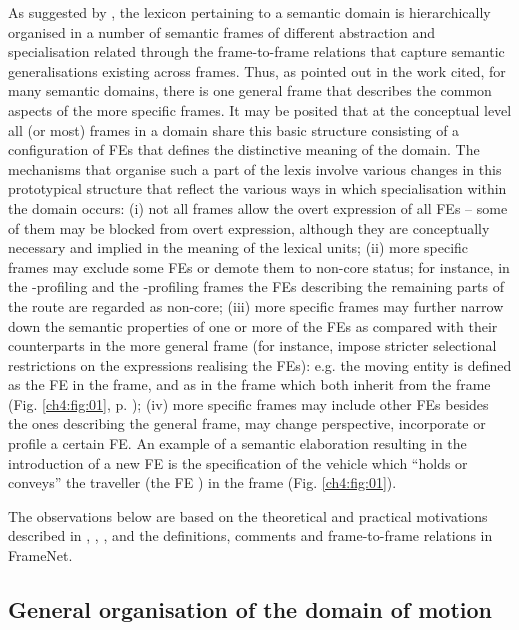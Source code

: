 \documentclass[output=paper,colorlinks,citecolor=brown]{langscibook}
\begin{document}
As suggested by \citet[16]{Johnson2001}, the lexicon pertaining to a semantic domain is hierarchically organised in a number of semantic frames of different abstraction and specialisation related through the frame-to-frame relations that capture semantic generalisations existing across frames. Thus, as pointed out in the work cited, for many semantic domains, there is one general frame that describes the common aspects of the more specific frames. It may be posited that at the conceptual level all (or most) frames in a domain share this basic structure consisting of a configuration of FEs that defines the distinctive meaning of the domain. The mechanisms that organise such a part of the lexis involve various changes in this prototypical structure that reflect the various ways in which specialisation within the domain occurs: (i) not all frames allow the overt expression of all FEs -- some of them may be blocked from overt expression, although they are conceptually necessary and implied in the meaning of the lexical units; (ii) more specific frames may exclude some FEs or demote them to non-core status; for instance, in the -profiling  and the -profiling  frames the FEs describing the remaining parts of the route are regarded as non-core; (iii) more specific frames may further narrow down the semantic properties of one or more of the FEs as compared with their counterparts in the more general frame (for instance, impose stricter selectional restrictions on the expressions realising the FEs): e.g. the moving entity is defined as the FE  in the  frame, and as  in the  frame which both inherit from the  frame (Fig. \ref{ch4:fig:01}, p. \pageref{ch4:fig:01}); (iv) more specific frames may include other FEs besides the ones describing the general frame, may change perspective, incorporate or profile a certain FE. An example of a semantic elaboration resulting in the introduction of a new FE is the specification of the vehicle which ``holds or conveys'' the traveller (the FE ) in the  frame (Fig. \ref{ch4:fig:01}).

The observations below are based on the theoretical and practical motivations described in \citet{Johnson2001}, \citet{Petruck2012}, \citet{Petruck2015}, \citet{Ruppenhofer2016} and the definitions, comments and frame-to-frame relations in FrameNet.

\subsection{General organisation of the domain of motion}
\end{document}
